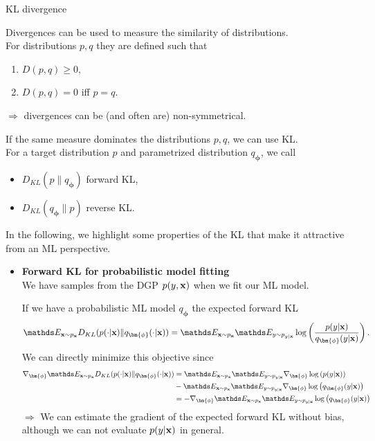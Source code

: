 \documentclass[11pt,compress,t,notes=noshow, xcolor=table]{beamer}
\begin{document}
\begin{vbframe}{KL divergence}

Divergences can be used to measure the similarity of distributions.\\
\lz For distributions $p, q$ they are defined such that
\begin{enumerate}
    \item $D(p, q) \geq 0,$
    \item $D(p, q) = 0$ iff $p = q.$
\end{enumerate}
$\Rightarrow$ divergences can be (and often are) non-symmetrical. \\
 \lz
 
If the same measure dominates the distributions $p,q$, we can use KL. \\
For a target distribution $p$ and parametrized distribution $q_{\bm{\phi}}$, we call
\begin{itemize}
    \item $D_{KL}(p \| q_{\bm{\phi}})$ forward KL,
    \item $D_{KL}(q_{\bm{\phi}} \| p)$ reverse KL.
\end{itemize}
\lz
In the following, we highlight some properties of the KL that make it attractive from an ML perspective.

\framebreak

\begin{itemize}
    \item \textbf{Forward KL for probabilistic model fitting}
    \\ We have samples from the DGP $p(y, \mathbf{x})$ when we fit our ML model.
    \\
    \lz
    
    If we have a probabilistic ML model $q_{\bm{\phi}}$ the  expected forward KL
    $$\E_{\xv \sim p_{\xv}}D_{KL}(p(\cdot|\xv) \| q_{\bm{\phi}}(\cdot|\xv)) = \E_{\xv \sim p_{\xv}}\E_{y \sim p_{y|\xv}}\log\left(\frac{p(y|\xv)}{q_{\bm{\phi}}(y|\xv)}\right).$$
We can directly minimize this objective since 
\begin{align*}
         \nabla_{\bm{\phi}} \E_{\xv \sim p_{\xv}}D_{KL}(p(\cdot|\xv) \| q_{\bm{\phi}}(\cdot|\xv)) &=  \E_{\xv \sim p_{\xv}}\E_{y \sim p_{y|\xv}}\nabla_{\bm{\phi}}\log\left(
         p(y|\xv)\right) \\
         &- \E_{\xv \sim p_{\xv}}\E_{y \sim p_{y|\xv}}\nabla_{\bm{\phi}}\log\left(q_{\bm{\phi}}(y|\xv)\right) \\
         &= -\nabla_{\bm{\phi}} \E_{\xv \sim p_{\xv}}\E_{y \sim p_{y|\xv}}\log\left(q_{\bm{\phi}}(y|\xv)\right)
     \end{align*}
     $\Rightarrow$ We can estimate the gradient of the expected forward KL without bias, although we can not evaluate $p(y\vert \mathbf{x})$ in general. 
\end{itemize}
 \framebreak


\end{vbframe}
\end{document}
